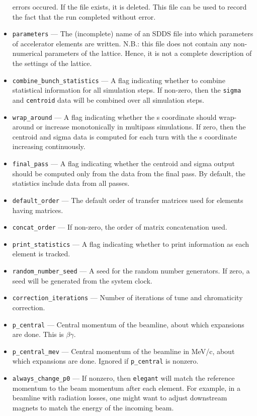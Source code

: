 \documentclass[11pt]{article}
\begin{document}
\begin{itemize}
errors occured.  If the file exists, it is deleted.  This file can be
used to record the fact that the run completed without error.
\item \verb|parameters| --- The (incomplete) name of an SDDS file into
which parameters of accelerator elements are written.
N.B.: this file does not contain any non-numerical parameters of the lattice.
Hence, it is not a complete description of the settings of the lattice.
\item \verb|combine_bunch_statistics| --- A flag indicating whether to
combine statistical information for all simulation steps.  If
non-zero, then the \verb|sigma| and \verb|centroid| data will be
combined over all simulation steps.
\item \verb|wrap_around| --- A flag indicating whether the s
 coordinate should wrap-around or increase monotonically in multipass
 simulations.  If zero, then the centroid and sigma data is computed for
 each turn with the s coordinate increasing continuously.
\item \verb|final_pass| --- A flag indicating whether the centroid and
 sigma output should be computed only from the data from the final pass.
 By default, the statistics include data from all passes.
\item \verb|default_order| --- The default order of transfer matrices
used for elements having matrices.
\item \verb|concat_order| --- If non-zero, the order of matrix
concatenation used.
\item \verb|print_statistics| --- A flag indicating whether to print
information as each element is tracked.
\item \verb|random_number_seed| --- A seed for the random number generators.  If zero, a seed will be generated from the system clock.
\item \verb|correction_iterations| --- Number of iterations of tune and chromaticity correction.
\item \verb|p_central| --- Central momentum of the beamline, about which expansions are done.
        This is $\beta\gamma$.
\item \verb|p_central_mev| --- Central momentum of the beamline in
MeV/c, about which expansions are done.  Ignored if \verb|p_central| is nonzero.
\item \verb|always_change_p0| --- If nonzero, then {\tt elegant} will match the reference momentum to
  the beam momentum after each element.  For example, in a beamline with radiation losses, one might
  want to adjust downstream magnets to match the energy of the incoming beam.

\end{itemize}
\end{document}
